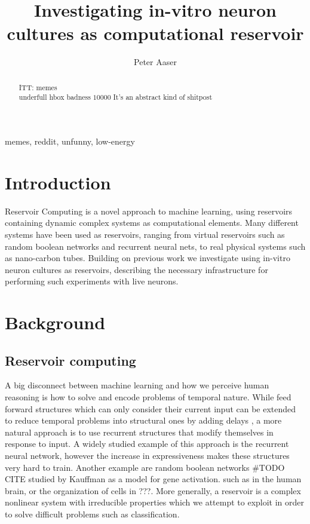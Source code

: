 \documentclass[journal]{IEEEtran}
\begin{document}
\title{Investigating in-vitro neuron cultures as computational reservoir}

\author{Peter Aaser}
%
\maketitle


\begin{abstract}
  ITT: memes\\
  underfull hbox badness $10000$
  It's an abstract kind of shitpost
\end{abstract}


\begin{IEEEkeywords}
memes, reddit, unfunny, low-energy
\end{IEEEkeywords}

\section{Introduction}
Reservoir Computing is a novel approach to machine learning, using reservoirs
containing dynamic complex systems as computational elements. 
\cite{schrauwen_overview_2007}
Many different systems have been used as reservoirs, ranging from
virtual reservoirs such as random boolean networks and recurrent neural nets,
to real physical systems such as nano-carbon tubes.
Building on previous work we investigate using in-vitro neuron cultures as
reservoirs, describing the necessary infrastructure for performing such
experiments with live neurons.

\section{Background}
\subsection{Reservoir computing}
A big disconnect between machine learning and how we perceive human reasoning is
how to solve and encode problems of temporal nature.
While feed forward structures which can only consider their current input can be
extended to reduce temporal problems into structural ones by adding delays
\cite{schrauwen_overview_2007}, a more natural approach is to use
recurrent structures that modify themselves in response to input.
A widely studied example of this approach is the recurrent neural network,
however the increase in expressiveness makes these structures very hard to train\cite{bertschinger_real-time_2004}.
Another example are random boolean networks #TODO CITE studied by Kauffman as a
model for gene activation.
such as in the human brain, or the organization of cells in ???.
More generally, a reservoir is a complex nonlinear system with irreducible properties
which we attempt to exploit in order to solve difficult problems such as classification.
\end{document}
